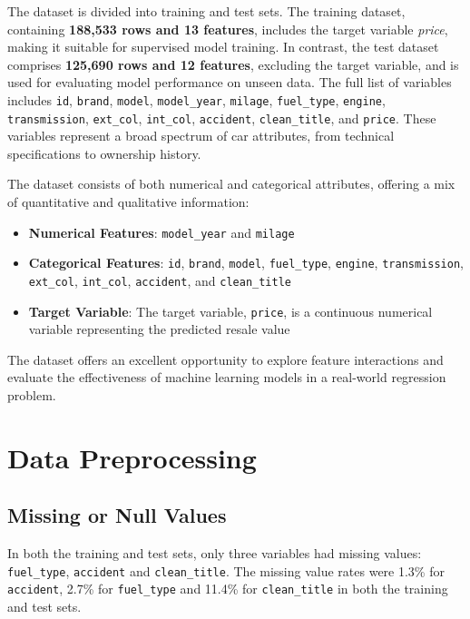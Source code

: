 \documentclass{article}
\begin{document}
The dataset is divided into training and test sets. The training dataset, containing \textbf{188,533 rows and 13 features}, includes the target variable \textit{price}, making it suitable for supervised model training. In contrast, the test dataset comprises \textbf{125,690 rows and 12 features}, excluding the target variable, and is used for evaluating model performance on unseen data. The full list of variables includes \texttt{id}, \texttt{brand}, \texttt{model}, \texttt{model\_year}, \texttt{milage}, \texttt{fuel\_type}, \texttt{engine}, \texttt{transmission}, \texttt{ext\_col}, \texttt{int\_col}, \texttt{accident}, \texttt{clean\_title}, and \texttt{price}. These variables represent a broad spectrum of car attributes, from technical specifications to ownership history.

The dataset consists of both numerical and categorical attributes, offering a mix of quantitative and qualitative information:

\begin{itemize}
   \item \textbf{Numerical Features}: \texttt{model\_year} and \texttt{milage}
   
   \item \textbf{Categorical Features}: \texttt{id}, \texttt{brand}, \texttt{model}, \texttt{fuel\_type}, \texttt{engine}, \texttt{transmission}, \texttt{ext\_col}, \texttt{int\_col}, \texttt{accident}, and \texttt{clean\_title}
   
   \item \textbf{Target Variable}: The target variable, \texttt{price}, is a continuous numerical variable representing the predicted resale value
\end{itemize}

The dataset offers an excellent opportunity to explore feature interactions and evaluate the effectiveness of machine learning models in a real-world regression problem.

\section{Data Preprocessing}

\subsection{Missing or Null Values}

In both the training and test sets, only three variables had missing values: \texttt{fuel\_type}, \texttt{accident} and \texttt{clean\_title}. The missing value rates were 1.3\% for \texttt{accident}, 2.7\% for \texttt{fuel\_type} and 11.4\% for \texttt{clean\_title} in both the training and test sets.
\end{document}
